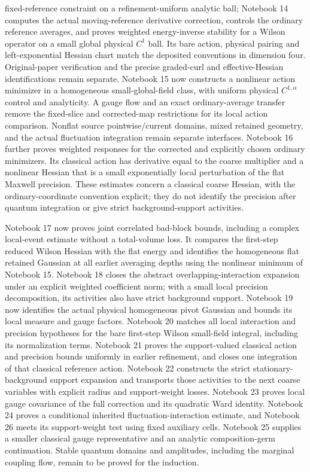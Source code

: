 \documentclass[11pt]{article}
\theoremstyle{remark}
\begin{document}
fixed-reference constraint on a refinement-uniform analytic ball;
Notebook 14 computes the actual moving-reference derivative
correction, controls the ordinary reference averages, and proves
weighted energy-inverse stability for a Wilson operator on a small
global physical $C^1$ ball. Its bare action, physical pairing and
left-exponential Hessian chart match the deposited conventions in
dimension four. Original-paper verification and the precise
graded-curl and effective-Hessian identifications remain separate.
Notebook 15 now constructs a nonlinear action minimizer in a
homogeneous small-global-field class, with uniform physical
$C^{1,\alpha}$ control and analyticity. A gauge flow and an exact
ordinary-average transfer remove the fixed-slice and corrected-map
restrictions for its local action comparison. Nonflat source
pointwise/current domains, mixed retained geometry, and the actual
fluctuation integration remain separate interfaces.
Notebook 16 further proves weighted responses for the corrected
and explicitly chosen ordinary minimizers. Its classical action
has derivative equal to the coarse multiplier and a nonlinear
Hessian that is a small exponentially local perturbation of the
flat Maxwell precision. These estimates concern a classical
coarse Hessian, with the ordinary-coordinate convention explicit;
they do not identify the precision after quantum integration or
give strict background-support activities.

Notebook 17 now proves joint correlated bad-block bounds, including
a complex local-event estimate without a total-volume loss. It
compares the first-step reduced Wilson Hessian with the flat energy
and identifies the homogeneous flat retained Gaussian at all earlier
averaging depths using the nonlinear minimum of Notebook 15.
Notebook 18 closes the abstract overlapping-interaction expansion
under an explicit weighted coefficient norm; with a small local
precision decomposition, its activities also have strict background
support. Notebook 19 now identifies the actual physical homogeneous
pivot Gaussian and bounds its local measure and gauge factors.
Notebook 20 matches all local interaction and precision hypotheses
for the bare first-step Wilson small-field integral, including
its normalization terms. Notebook 21 proves the support-valued
classical action and precision bounds uniformly in earlier
refinement, and closes one integration of that classical reference
action. Notebook 22 constructs the strict stationary-background
support expansion and transports those activities to the next
coarse variables with explicit radius and support-weight losses.
Notebook 23 proves local gauge covariance of the full correction
and its quadratic Ward identity. Notebook 24 proves a conditional
inherited fluctuation-interaction estimate, and Notebook 26
meets its support-weight test using fixed auxiliary cells.
Notebook 25 supplies a smaller classical gauge representative
and an analytic composition-germ continuation. Stable quantum
domains and amplitudes, including the marginal coupling flow,
remain to be proved for the induction.
\end{document}
